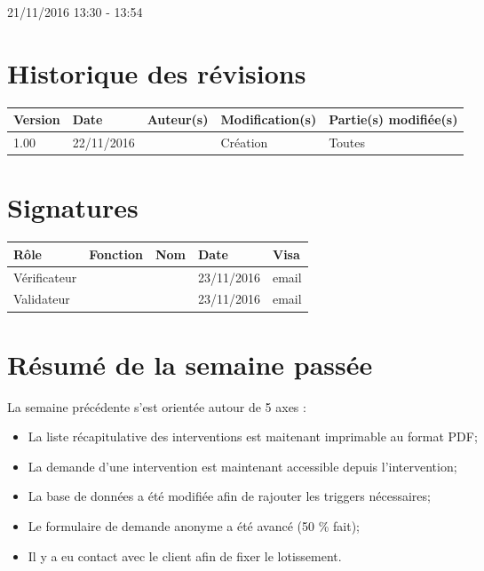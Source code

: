 \documentclass [a4paper] {article}
\begin{document}
21/11/2016			 				%
\hfill   
\hfill 	 13:30 - 13:54				%


\section*{Historique des révisions}
\begin{center}
			\begin{tabular}{| p{2.5cm} | p{3cm} | p{3cm} | p{3cm} | p{3.5cm} |}
				\hline
				\rowcolor{Gray}
				Version & Date & Auteur(s) & Modification(s) & Partie(s) modifiée(s)		 \\
				\hline
				1.00 & 22/11/2016 & \Kafui & Création & Toutes \\
				\hline			
			\end{tabular}
		\end{center}

\section*{Signatures}

		\begin{center}
			\begin{tabular}{| p{2.5cm} | p{4cm} | p{3cm} | p{3cm} | p{2.5cm} |}
				\hline
				\rowcolor{Gray}
				Rôle & Fonction & Nom & Date & Visa		 \\
				\hline
				Vérificateur & \RGC & \Melissa & 23/11/2016 & email \\[30pt]
				\hline
				Validateur & \CP & \Pierre &  23/11/2016 & email \\[30pt]	
				\hline
			\end{tabular}
		\end{center}

\section{Résumé de la semaine passée}
La semaine précédente s'est orientée autour de 5 axes :  
\begin{itemize}
	\item La liste récapitulative des interventions est maitenant imprimable au format PDF;
	\item La demande d'une intervention est maintenant accessible depuis l'intervention;
	\item La base de données a été modifiée afin de rajouter les triggers nécessaires;
	\item Le formulaire de demande anonyme a été avancé (50 \% fait);
	\item Il y a eu contact avec le client afin de fixer le lotissement.
\end{itemize} 
\end{document}
